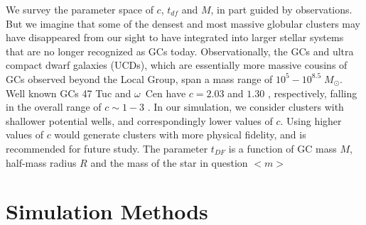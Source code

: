 \documentclass{princeton_astro_thesis}
\newcommand\msun{\; M_\odot}
\numberwithin{equation}{section}
\begin{document}
We survey the parameter space of $c$, $t_{df}$ and $M$, in part guided by observations.
But we imagine that some of the densest and most massive globular clusters may have disappeared from 
our sight to have integrated into larger stellar systems that are no longer recognized as GCs today.
Observationally, the GCs and ultra compact dwarf galaxies (UCDs), which are essentially more massive cousins
of GCs observed beyond the Local Group, span a mass range of $10^5-10^{8.5}\msun$.  
Well known GCs 47 Tuc and $\omega$~Cen have $c=2.03$ and $1.30$ \citep[][]{2000Carraro}, respectively,
falling in the overall range of $c\sim 1-3$ \citep[e.g.,][]{2007Evstigneeva}. In our simulation, we consider clusters with shallower potential wells, and correspondingly lower values of $c$.  Using higher values of $c$ would generate clusters with more physical fidelity, and is recommended for future study.
The parameter $t_{DF}$ is a function of GC mass $M$, half-mass radius $R$ and the mass of the star in question $<m>$


\chapter{Simulation Methods} \label{ch:Methods}
\end{document}
